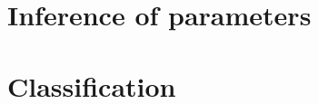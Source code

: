 \documentclass[letterpaper]{article}
\begin{document}
\section{Inference of parameters}

\section{Classification}
\end{document}
